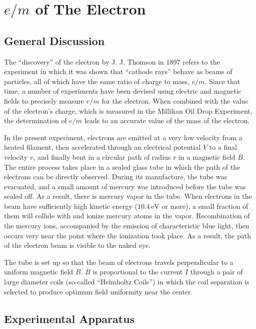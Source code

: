 \chapter{$e/ m$ of The Electron}
\section{General Discussion}
The ``discovery'' of the electron by J. J. Thomson in 1897 refers to the experiment in which it was shown that ``cathode rays'' behave as beams of particles, all of which have the same ratio of charge to mass, $e/m$. Since that time, a number of experiments have been devised using electric and magnetic fields to precisely measure $e/m$ for the electron. When combined with the value of the electron's charge, which is measured in the Millikan Oil Drop Experiment, the determination of $e/m$ leads to an accurate value of the mass of the electron.\myskip

In the present experiment, electrons are emitted at a very low velocity from a heated filament, then accelerated through an electrical potential $V$ to a final velocity $v$, and finally bent in a circular path of radius $r$ in a magnetic field $B$. The entire process takes place in a sealed glass tube in which the path of the electrons can be directly observed. During its manufacture, the tube was evacuated, and a small amount of mercury was introduced before the tube was sealed off. As a result, there is mercury vapor in the tube. When electrons in the beam have sufficiently high kinetic energy ($10.4\,\mathrm{eV}$ or more), a small fraction of them will collide with and ionize mercury atoms in the vapor. Recombination of the mercury ions, accompanied by the emission of characteristic blue light, then occurs very near the point where the ionization took place. As a result, the path of the electron beam is visible to the naked eye. \myskip

The tube is set up so that the beam of electrons travels perpendicular to a uniform magnetic field $B$. $B$ is proportional to the current $I$ through a pair of large diameter coils (so-called ``Helmholtz Coils'') in which the coil separation is selected to produce optimum field uniformity near the center.

\section{Experimental Apparatus}
